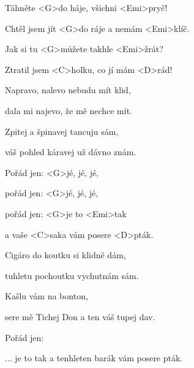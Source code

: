 

\zs
Táhněte <G>do háje, všichni <Emi>pryč!

Chtěl jsem jít <G>do ráje a nemám <Emi>klíč.

Jak si tu <G>můžete takhle <Emi>žrát?

Ztratil jsem <C>holku, co jí mám <D>rád!
\ks

\zs
Napravo, nalevo nebudu mít klid,

dala mi najevo, že mě nechce mít.

Zpitej a špinavej tancuju sám,

váš pohled káravej už dávno znám.
\ks

\zr
Pořád jen:  <G>jé, jé, jé,

pořád jen:  <G>jé, jé, jé,

pořád jen:  <G>je to <Emi>tak

a vaše <C>saka vám posere <D>pták.
\kr

\zs
Cigáro do koutku si klidně dám,

tuhletu pochoutku vychutnám sám.

Kašlu vám na bonton, 

sere mě Tichej Don a ten váš tupej dav.
\ks

\zr \kr

\zr
Pořád jen: 

... je to tak a tenhleten barák vám posere pták.
\kr

\kp
